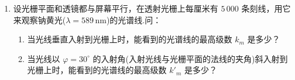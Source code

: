 \begin{enumerate}
	
	\item[\textbf{L11-5}] 设光栅平面和透镜都与屏幕平行，在透射光栅上每厘米有 $5\,000$ 条刻线，用它来观察钠黄光($\lambda = 589\,\mathrm{nm}$)的光谱线.问：
	
	\begin{enumerate}
		\item 当光线垂直入射到光栅上时，能看到的光谱线的最高级数 $k_m$ 是多少？
		\item 当光线以 $\varphi = 30^\circ$ 的入射角(入射光线与光栅平面的法线的夹角)斜入射到光栅上时，能看到的光谱线的最高级数 $k'_m$ 是多少？
	\end{enumerate}
	
	
	
\end{enumerate}

\newpage